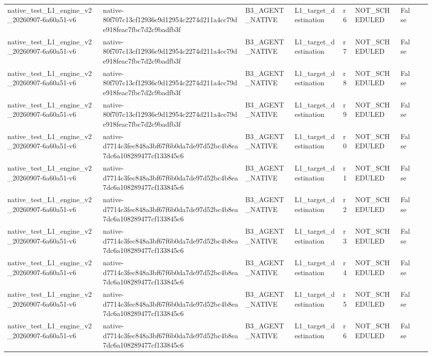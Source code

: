 \begin{tabular}{lllllllll}
native\_test\_L1\_engine\_v2\_20260907-6a60a51-v6 & native-80f707c13cf12936c9d12954c2274d211a4cc79de918feac7fbc7d2c9badfb3f & B3\_AGENT\_NATIVE & L1\_target\_destination & r6 & NOT\_SCHEDULED & False &  &  \\
native\_test\_L1\_engine\_v2\_20260907-6a60a51-v6 & native-80f707c13cf12936c9d12954c2274d211a4cc79de918feac7fbc7d2c9badfb3f & B3\_AGENT\_NATIVE & L1\_target\_destination & r7 & NOT\_SCHEDULED & False &  &  \\
native\_test\_L1\_engine\_v2\_20260907-6a60a51-v6 & native-80f707c13cf12936c9d12954c2274d211a4cc79de918feac7fbc7d2c9badfb3f & B3\_AGENT\_NATIVE & L1\_target\_destination & r8 & NOT\_SCHEDULED & False &  &  \\
native\_test\_L1\_engine\_v2\_20260907-6a60a51-v6 & native-80f707c13cf12936c9d12954c2274d211a4cc79de918feac7fbc7d2c9badfb3f & B3\_AGENT\_NATIVE & L1\_target\_destination & r9 & NOT\_SCHEDULED & False &  &  \\
native\_test\_L1\_engine\_v2\_20260907-6a60a51-v6 & native-d7714c3fec848a3bf67f6b0da7de97d52bc4b8ea7dc6a108289477cf133845c6 & B3\_AGENT\_NATIVE & L1\_target\_destination & r0 & NOT\_SCHEDULED & False &  &  \\
native\_test\_L1\_engine\_v2\_20260907-6a60a51-v6 & native-d7714c3fec848a3bf67f6b0da7de97d52bc4b8ea7dc6a108289477cf133845c6 & B3\_AGENT\_NATIVE & L1\_target\_destination & r1 & NOT\_SCHEDULED & False &  &  \\
native\_test\_L1\_engine\_v2\_20260907-6a60a51-v6 & native-d7714c3fec848a3bf67f6b0da7de97d52bc4b8ea7dc6a108289477cf133845c6 & B3\_AGENT\_NATIVE & L1\_target\_destination & r2 & NOT\_SCHEDULED & False &  &  \\
native\_test\_L1\_engine\_v2\_20260907-6a60a51-v6 & native-d7714c3fec848a3bf67f6b0da7de97d52bc4b8ea7dc6a108289477cf133845c6 & B3\_AGENT\_NATIVE & L1\_target\_destination & r3 & NOT\_SCHEDULED & False &  &  \\
native\_test\_L1\_engine\_v2\_20260907-6a60a51-v6 & native-d7714c3fec848a3bf67f6b0da7de97d52bc4b8ea7dc6a108289477cf133845c6 & B3\_AGENT\_NATIVE & L1\_target\_destination & r4 & NOT\_SCHEDULED & False &  &  \\
native\_test\_L1\_engine\_v2\_20260907-6a60a51-v6 & native-d7714c3fec848a3bf67f6b0da7de97d52bc4b8ea7dc6a108289477cf133845c6 & B3\_AGENT\_NATIVE & L1\_target\_destination & r5 & NOT\_SCHEDULED & False &  &  \\
native\_test\_L1\_engine\_v2\_20260907-6a60a51-v6 & native-d7714c3fec848a3bf67f6b0da7de97d52bc4b8ea7dc6a108289477cf133845c6 & B3\_AGENT\_NATIVE & L1\_target\_destination & r6 & NOT\_SCHEDULED & False &  &  \\

\end{tabular}
